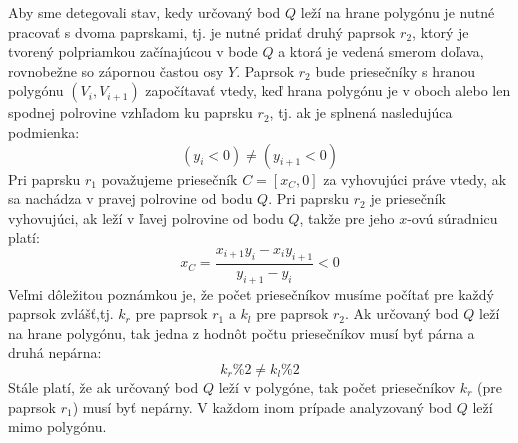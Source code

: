 \documentclass[11pt]{article}
\begin{document}
Aby sme detegovali stav, kedy určovaný bod $Q$ leží na hrane polygónu je nutné pracovať s dvoma paprskami, tj. je nutné pridať druhý paprsok $r_2$, ktorý je tvorený polpriamkou začínajúcou v bode $Q$ a ktorá je vedená smerom doľava, rovnobežne so zápornou častou osy $Y$. Paprsok $r_2$ bude priesečníky s hranou polygónu $(V_i, V_{i+1})$ započítavať vtedy, keď hrana polygónu je v oboch alebo len spodnej polrovine vzhľadom ku paprsku $r_2$, tj. ak je splnená nasledujúca podmienka:
\begin{equation*}
(y_i<0) \neq (y_{i+1}<0)
\end{equation*}
Pri paprsku $r_1$ považujeme priesečník $C=[x_C, 0]$ za vyhovujúci práve vtedy, ak sa nachádza v pravej polrovine od bodu $Q$. Pri paprsku $r_2$ je priesečník vyhovujúci, ak leží v ľavej polrovine od bodu $Q$, takže pre jeho $x$-ovú súradnicu platí:
\begin{equation*}
x_C=\frac{x_{i+1} y_i - x_i y_{i+1}}{y_{i+1}-y_i}<0
\end{equation*}
Veľmi dôležitou poznámkou je, že počet priesečníkov musíme počítať pre každý paprsok zvlášť,\linebreak tj. $k_r$ pre paprsok $r_1$ a $k_l$ pre paprsok $r_2$. Ak určovaný bod $Q$ leží na hrane polygónu, tak jedna z hodnôt počtu priesečníkov musí byť párna a druhá nepárna:
\begin{equation*}
k_r\%2 \neq k_l\%2
\end{equation*}
Stále platí, že ak určovaný bod $Q$ leží v polygóne, tak počet priesečníkov $k_r$ (pre paprsok $r_1$) musí byť nepárny.  V každom inom prípade analyzovaný bod $Q$ leží mimo polygónu.
\end{document}
